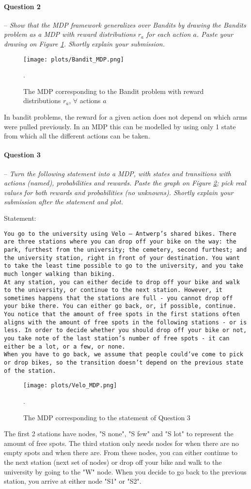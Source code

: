 \documentclass[a4paper]{article}
\newcommand{\question}[2]{
\paragraph{Question #1} -- \textit{#2}

}
\begin{document}
\question{2}{Show that the MDP framework generalizes over Bandits by drawing the Bandits problem as a MDP with reward distributions $r_a$ for each action $a$. Paste your drawing on Figure \ref{fig:bandit_mdp}. Shortly explain your submission.}

\begin{figure}[H]
    \centering
    \texttt{[image: plots/Bandit\_MDP.png]}
    \caption{The MDP corresponding to the Bandit problem with reward distributions $r_a$, $\forall$ actions $a$}.
    \label{fig:bandit_mdp}
\end{figure}{}
In bandit problems, the reward for a given action does not depend on which arms were pulled previously. In an MDP this can be modelled by using only 1 state from which all the different actions can be taken.


\question{3}{Turn the following statement into a MDP, with states and transitions with actions (named), probabilities and rewards. Paste the graph on Figure \ref{fig:q3}; pick real values for both rewards and probabilities (no unknowns). Shortly explain your submission after the statement and plot.}

Statement:

\texttt{You go to the university using Velo -- Antwerp's shared bikes. There are three stations where you can drop off your bike on the way: the park, furthest from the university; the cemetery, second furthest; and the university station, right in front of your destination.
You want to take the least time possible to go to the university, and you take much longer walking than biking. \\
At any station, you can either decide to drop off your bike and walk to the university, or continue to the next station.
However, it sometimes happens that the stations are full - you cannot drop off your bike there. You can either go back, or, if possible, continue.\\
You notice that the amount of free spots in the first stations often aligns with the amount of free spots in the following stations - or is less. In order to decide whether you should drop off your bike or not, you take note of the last station's number of free spots - it can either be a lot, or a few, or none.\\
When you have to go back, we assume that people could've come to pick or drop bikes, so the transition doesn't depend on the previous state of the station.
}

\begin{figure}[H]
    \centering
    \texttt{[image: plots/Velo\_MDP.png]}
    \caption{The MDP corresponding to the statement of Question 3}.
    \label{fig:q3}
\end{figure}{}
The first 2 stations have nodes, "S none", "S few" and "S lot" to represent the amount of free spots. The third station only needs nodes for when there are no empty spots and when there are.
From these nodes, you can either continue to the next station (next set of nodes) or drop off your bike and walk to the university by going to the "W" node.
When you decide to go back to the previous station, you arrive at either node "S1" or "S2".
\end{document}
